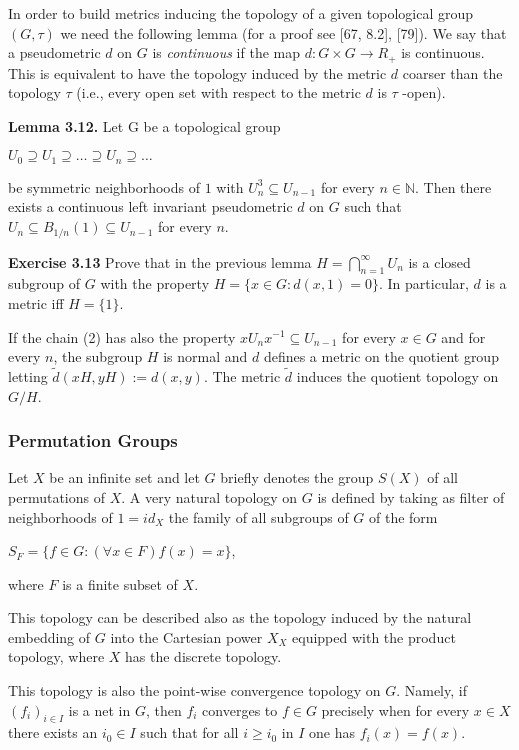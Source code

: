 \documentclass[12pt]{article}
\begin{document}
    In order to build metrics inducing the topology of a given topological group $(G, \tau)$ we need the following
lemma (for a proof see [67, 8.2], [79]). We say that a pseudometric $d$ on $G$ is \emph{continuous} if the map $d : G \times G \to R_+$
is continuous. This is equivalent to have the topology induced by the metric $d$ coarser than the topology $\tau$ (i.e.,
every open set with respect to the metric $d$ is $\tau$ -open).


\textbf{Lemma 3.12.} Let G be a topological group


    $U_0 \supseteq U_1 \supseteq \dots \supseteq U_n \supseteq \dots $


        be symmetric neighborhoods of $1$ with $U^3_n \subseteq U_{n-1}$ for every $n \in \mathbb{N}$. Then there exists a continuous left invariant
    pseudometric $d$ on $G$ such that $U_n \subseteq B_{1/n}(1) \subseteq U_{n-1}$ for every $n$.


\textbf{Exercise 3.13} Prove that in the previous lemma $H = \bigcap^{\infty}_{n=1} U_n$ is a closed subgroup of $G$ with the property
$H = \{x \in G : d(x, 1) = 0\}$. In particular, $d$ is a metric iff $H = \{1\}$.


    If the chain (2) has also the property $xU_n x ^{-1} \subseteq U_{n-1}$ for every $x \in G$ and for every $n$, the subgroup $H$ is
normal and $d$ defines a metric on the quotient group letting $\tilde{d}(xH, yH) := d(x, y)$. The metric $\tilde{d}$ induces the
quotient topology on $G/H$.


\subsubsection{Permutation Groups}


    Let $X$ be an infinite set and let $G$ briefly denotes the group $S(X)$ of all permutations of $X$. A very natural
    topology on $G$ is defined by taking as filter of neighborhoods of $1 = id_X$ the family of all subgroups of $G$ of the
    form 
    
    
        $S_F = \{f \in G : (\forall x \in F) f(x) = x\}$,
        
        
    where $F$ is a finite subset of $X$.


    This topology can be described also as the topology induced by the natural embedding of $G$ into the Cartesian
    power $X_X$ equipped with the product topology, where $X$ has the discrete topology.


    This topology is also the point-wise convergence topology on $G$. Namely, if $(f_i)_{i \in I}$ is a net in $G$, then $f_i$
    converges to $f \in G$ precisely when for every $x \in X$ there exists an $i_0 \in I$ such that for all $i \geq i_0$ in $I$ one has
    $f_i (x) = f(x)$.
\end{document}
